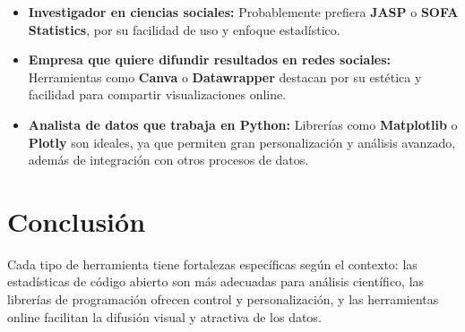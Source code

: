 \documentclass{../../miPlantilla}
\begin{document}
\begin{itemize}
    \item \textbf{Investigador en ciencias sociales:} Probablemente prefiera \textbf{JASP} o \textbf{SOFA Statistics}, por su facilidad de uso y enfoque estadístico.
    \item \textbf{Empresa que quiere difundir resultados en redes sociales:} Herramientas como \textbf{Canva} o \textbf{Datawrapper} destacan por su estética y facilidad para compartir visualizaciones online.
    \item \textbf{Analista de datos que trabaja en Python:} Librerías como \textbf{Matplotlib} o \textbf{Plotly} son ideales, ya que permiten gran personalización y análisis avanzado, además de integración con otros procesos de datos.
\end{itemize}

\section{Conclusión}
Cada tipo de herramienta tiene fortalezas específicas según el contexto: las estadísticas de código abierto son más adecuadas para análisis científico, las librerías de programación ofrecen control y personalización, y las herramientas online facilitan la difusión visual y atractiva de los datos.
\end{document}
